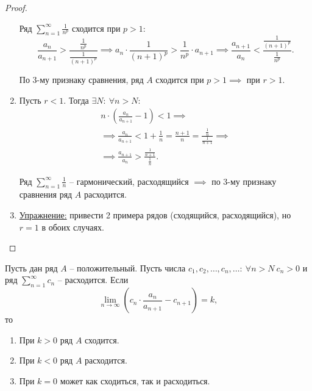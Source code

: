 \begin{proof}
\begin{enumerate}
              Ряд $\sum_{n=1}^{\infty}\frac{1}{n^p}$ сходится при $p > 1$:
              \[
                  \frac{a_n}{a_{n+1}} > \frac{\frac{1}{n^p}}{\frac{1}{(n+1)^p}} \implies a_n \cdot \frac{1}{(n+1)^p} > \frac{1}{n^p} \cdot a_{n+1} \implies \frac{a_{n+1}}{a_n} < \frac{\frac{1}{(n+1)^p}}{\frac{1}{n^p}}.
              \]

              По 3-му признаку сравнения, ряд $A$ сходится при $p > 1 \implies$ при $r > 1$.

        \item Пусть $r < 1$. Тогда $\exists N: \ \forall n > N$:
              \begin{multline*}
                  n \cdot \left(\frac{a_n}{a_{n+1}} - 1\right) < 1 \implies \\
                  \implies \frac{a_n}{a_{n+1}} < 1 + \frac{1}{n} = \frac{n+1}{n} = \frac{\frac{1}{n}}{\frac{1}{n+1}} \implies \\
                  \implies \frac{a_{n+1}}{a_n} > \frac{\frac{1}{n+1}}{\frac{1}{n}}.
              \end{multline*}

              Ряд $\sum_{n=1}^{\infty}\frac{1}{n}$ -- гармонический, расходящийся $\implies$ по 3-му признаку сравнения ряд $A$ расходится.

        \item \underline{Упражнение:} привести 2 примера рядов (сходящийся, расходящийся), но $r=1$ в обоих случаях.
    \end{enumerate}
\end{proof}

\begin{theorem}
    Пусть дан ряд $A$ -- положительный. Пусть числа $c_1,c_2,\ldots,c_n,\ldots: \ \forall n > N \ c_n > 0$ и ряд $\sum_{n=1}^{\infty}c_n$ -- расходится. Если
    \[
        \underset{n\rightarrow\infty}{\lim}\left(c_n \cdot \frac{a_n}{a_{n+1}} - c_{n+1}\right) = k,
    \]
    то
    \begin{enumerate}
        \item При $k > 0$ ряд $A$ сходится.
        \item При $k < 0$ ряд $A$ расходится.
        \item При $k = 0$ может как сходиться, так и расходиться.
    \end{enumerate}
\end{theorem}

